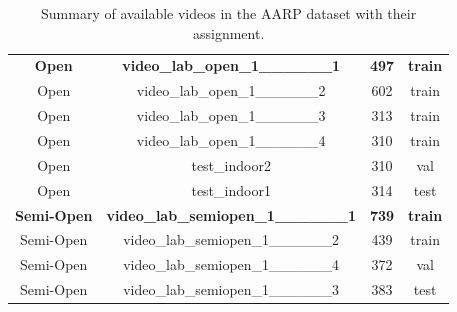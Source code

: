 \documentclass[12pt,oneside]{book} %
\begin{document}
\begin{table}[H]
\begin{tabular}{@{}cccc@{}}
        \textbf{Open}      & \textbf{video\_lab\_open\_1\_\_\_\_\_\_1}     & \textbf{497}              & \textbf{train}      \\
        Open               & video\_lab\_open\_1\_\_\_\_\_\_2              & 602                       & train               \\
        Open               & video\_lab\_open\_1\_\_\_\_\_\_3              & 313                       & train               \\
        Open               & video\_lab\_open\_1\_\_\_\_\_\_4              & 310                       & train               \\
        Open               & test\_indoor2                                 & 310                       & val                 \\
        Open               & test\_indoor1                                 & 314                       & test                \\
        \textbf{Semi-Open} & \textbf{video\_lab\_semiopen\_1\_\_\_\_\_\_1} & \textbf{739}              & \textbf{train}      \\
        Semi-Open          & video\_lab\_semiopen\_1\_\_\_\_\_\_2          & 439                       & train               \\
        Semi-Open          & video\_lab\_semiopen\_1\_\_\_\_\_\_4          & 372                       & val                 \\ 
        Semi-Open          & video\_lab\_semiopen\_1\_\_\_\_\_\_3          & 383                       & test                \\ \bottomrule
    \end{tabular}
    \caption{\centering Summary of available videos in the AARP dataset with their assignment.}
    \label{tab:video_summary}
\end{table}

\newpage
\end{document}
